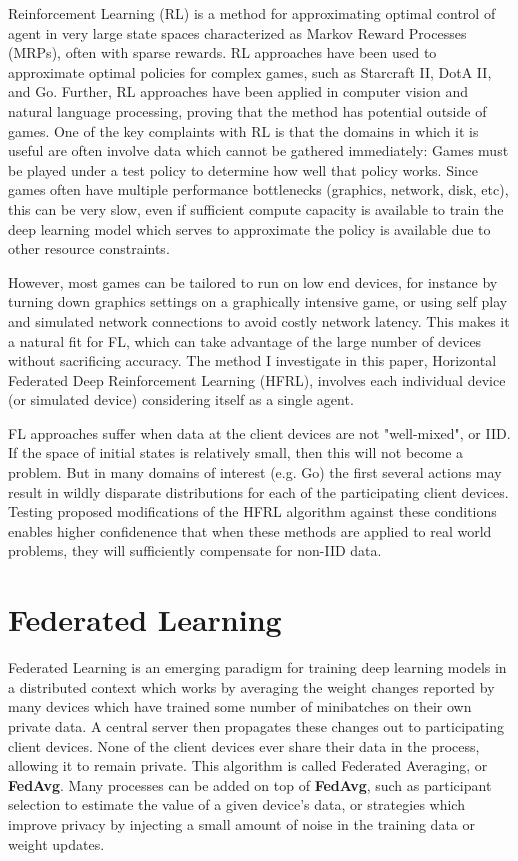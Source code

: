 \documentclass[10pt,journal]{IEEEtran}
\begin{document}
Reinforcement Learning (RL) is a method for approximating optimal control of agent in
very large state spaces characterized as Markov Reward Processes (MRPs), often with
sparse rewards. RL approaches have been used to approximate optimal policies
for complex games, such as Starcraft II\cite{alphastarblog}, DotA II\cite{openai_dota_2019},
and Go\cite{qi_federated_2021}. Further, RL approaches have been applied in computer vision\cite{bellver_hierarchical_2016}
and natural language processing\cite{siddique_unsupervised_2020}, proving that the method has potential outside
of games. One of the key complaints with RL is that the domains in which it is useful are
often involve data which cannot be gathered immediately: Games must be played under
a test policy to determine how well that policy works. Since games often have multiple
performance bottlenecks (graphics, network, disk, etc), this can be very slow, even if sufficient
compute capacity is available to train the deep learning model which serves to approximate the policy
is available due to other resource constraints.

However, most games can be tailored to run on low end devices, for instance by turning down
graphics settings on a graphically intensive game, or using self play and simulated network
connections to avoid costly network latency. This makes it a natural fit for FL, which can
take advantage of the large number of devices without sacrificing accuracy. The method I
investigate in this paper, Horizontal Federated Deep Reinforcement Learning (HFRL), involves
each individual device (or simulated device) considering itself as a single agent.

FL approaches suffer when data at the client devices are not "well-mixed", or IID. If the space
of initial states is relatively small, then this will not become a problem. But in many domains
of interest (e.g. Go) the first several actions may result in wildly disparate distributions for
each of the participating client devices. Testing proposed modifications of the HFRL algorithm
against these conditions enables higher confidenence that when these methods are applied to real
world problems, they will sufficiently compensate for non-IID data.

\section{Federated Learning}

Federated Learning is an emerging paradigm for training deep learning models in a distributed context
which works by averaging the weight changes reported by many devices which have trained some number
of minibatches on their own private data. A central server then propagates these changes out to
participating client devices. None of the client devices ever share their data in the process, allowing
it to remain private\cite{fedavg}. This algorithm is called Federated Averaging, or \textbf{FedAvg}.
Many processes can be added on top of \textbf{FedAvg}, such as participant selection to estimate the
value of a given device's data\cite{lai_oort_2021}, or strategies which improve privacy by injecting a small
amount of noise in the training data or weight updates\cite{wei_federated_2019}.
\end{document}
